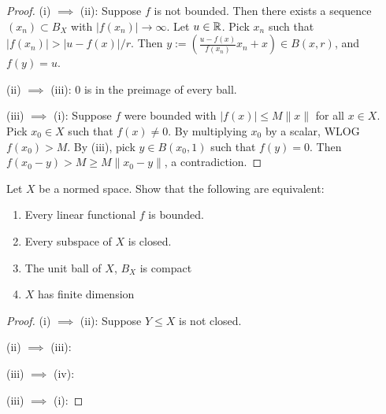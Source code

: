 \documentclass{article}
\begin{document}
\begin{proof}
(i) $\implies$ (ii): Suppose $f$ is not bounded. Then there exists a sequence $(x_n) \subset B_X$ with $|f(x_n)| \to \infty$.  Let $u \in \mathbb{R}$.  Pick $x_n$ such that $|f(x_n)| > |u - f(x)|/r$.  Then $y := (\frac{u - f(x)}{f(x_n)} x_n + x) \in B(x,r)$, and $f(y) = u$.

(ii) $\implies$ (iii):  $0$ is in the preimage of every ball.

(iii) $\implies$ (i): Suppose $f$ were bounded with $|f(x)| \le M \|x\|$ for all $x \in X$.  Pick $x_0 \in X$ such that $f(x) \neq 0$. By multiplying $x_0$ by a scalar, WLOG $f(x_0) > M$.  By (iii), pick $y \in B(x_0, 1)$ such that $f(y) = 0$.  Then $f(x_0 - y) > M \ge M \|x_0 - y\|$, a contradiction.
\end{proof}


 Let $X$ be a normed space. Show that the following are equivalent:
\begin{enumerate}
\item Every linear functional $f$ is bounded.
\item Every subspace of $X$ is closed.
\item The unit ball of $X$, $B_X$ is compact
\item $X$ has finite dimension
\end{enumerate}

\begin{proof}
(i) $\implies$ (ii):  Suppose $Y \le X$ is not closed.

(ii) $\implies$ (iii): 

(iii) $\implies$ (iv): 

(iii) $\implies$ (i): 


\end{proof}
\end{document}
